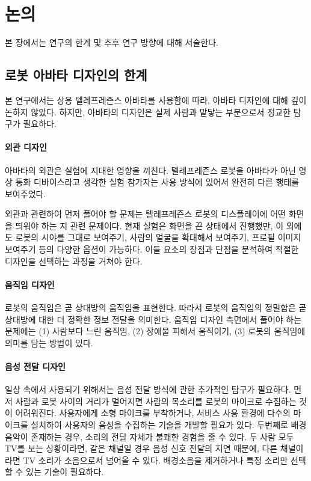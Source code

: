 \chapter{논의}
\label{sec:discussion}

본 장에서는 연구의 한계 및 추후 연구 방향에 대해 서술한다.

\section{로봇 아바타 디자인의 한계}

본 연구에서는 상용 텔레프레즌스 아바타를 사용함에 따라, 아바타 디자인에 대해 깊이 논하지 않았다. 하지만, 아바타의 디자인은 실제 사람과 맡닿는 부분으로서 정교한 탐구가 필요하다.


\subsubsection{외관 디자인}

아바타의 외관은 실험에 지대한 영향을 끼친다. 텔레프레즌스 로봇을 아바타가 아닌 영상 통화 디바이스라고 생각한 실험 참가자는 사용 방식에 있어서 완전히 다른 행태를 보여주었다.

외관과 관련하여 먼저 풀어야 할 문제는 텔레프레즌스 로봇의 디스플레이에 어떤 화면을 띄워야 하는 지 관련 문제이다. 현재 실험은 화면을 끈 상태에서 진행했만, 이 외에도 로봇의 시야를 그대로 보여주기, 사람의 얼굴을 확대해서 보여주기, 프로필 이미지 보여주기 등의 다양한 옵션이 가능하다. 이들 요소의 장점과 단점을 분석하여 적절한 디자인을 선택하는 과정을 거쳐야 한다.

\subsubsection{움직임 디자인}

로봇의 움직임은 곧 상대방의 움직임을 표현한다. 따라서 로봇의 움직임의 정밀함은 곧 상대방에 대한 더 정확한 정보 전달을 의미한다. 움직임 디자인 측면에서 풀어야 하는 문제에는 (1) 사람보다 느린 움직임, (2) 장애물 피해서 움직이기, (3) 로봇의 움직임에 의미를 담는 방법이 있다.


\subsubsection{음성 전달 디자인}

일상 속에서 사용되기 위해서는 음성 전달 방식에 관한 추가적인 탐구가 필요하다. 먼저 사람과 로봇 사이의 거리가 멀어지면 사람의 목소리를 로봇의 마이크로 수집하는 것이 어려워진다. 사용자에게 소형 마이크를 부착하거나, 서비스 사용 환경에 다수의 마이크를 설치하여 사용자의 음성을 수집하는 기술을 개발할 필요가 있다. 두번째로 배경음악이 존재하는 경우, 소리의 전달 자체가 불쾌한 경험을 줄 수 있다. 두 사람 모두 TV를 보는 상황이라면, 같은 채널일 경우 음성 신호 전달의 지연 때문에, 다른 채널이라면 TV 소리가 소음으로서 넘어올 수 있다. 배경소음을 제거하거나 특정 소리만 선택할 수 있는 기술\cite{flanagan1993spatially}이 필요하다.  


